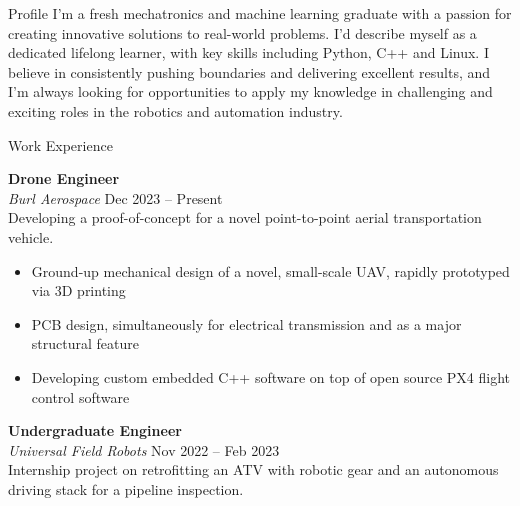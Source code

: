 \documentclass{minimal-resume}
\begin{document}
\begin{minipage}[t]{0.61\textwidth}

  \raggedright


  \begin{section}{Profile}
    I'm a fresh mechatronics and machine learning graduate with a passion for creating innovative solutions to real-world problems. I'd describe myself as a dedicated lifelong learner, with key skills including Python, C++ and Linux. I believe in consistently pushing boundaries and delivering excellent results, and I'm always looking for opportunities to apply my knowledge in challenging and exciting roles in the robotics and automation industry.
  \end{section}

  \SectionRule


  \begin{section}{Work Experience}

    \textbf{Drone Engineer} \\[8pt]

    \textit{Burl Aerospace} \hfill Dec 2023 -- Present \\[8pt]

    Developing a proof-of-concept for a novel point-to-point aerial transportation vehicle.

    \begin{itemize}[leftmargin=*]
      \item Ground-up mechanical design of a novel, small-scale UAV, rapidly prototyped via 3D printing
      \item PCB design, simultaneously for electrical transmission and as a major structural feature
      \item Developing custom embedded C++ software on top of open source PX4 flight control software
    \end{itemize}

    \vspace{8pt}

    \textbf{Undergraduate Engineer} \\[8pt]

    \textit{Universal Field Robots} \hfill Nov 2022 -- Feb 2023\\[8pt]

    Internship project on retrofitting an ATV with robotic gear and an autonomous driving stack for a pipeline inspection.


\end{section}
\end{minipage}
\end{document}
